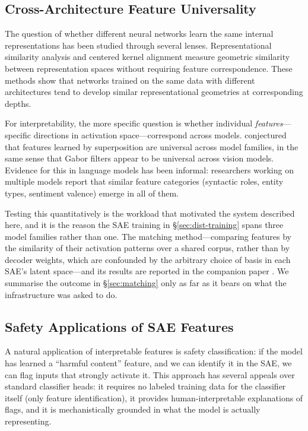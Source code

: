 \documentclass[11pt]{article}
\begin{document}
\subsection{Cross-Architecture Feature Universality}

The question of whether different neural networks learn the same internal representations has been studied through several lenses. Representational similarity analysis \citep{kriegeskorte2008rsa} and centered kernel alignment \citep{kornblith2019similarity} measure geometric similarity between representation spaces without requiring feature correspondence. These methods show that networks trained on the same data with different architectures tend to develop similar representational geometries at corresponding depths.

For interpretability, the more specific question is whether individual \emph{features}---specific directions in activation space---correspond across models. \citet{elhage2022superposition} conjectured that features learned by superposition are universal across model families, in the same sense that Gabor filters appear to be universal across vision models. Evidence for this in language models has been informal: researchers working on multiple models report that similar feature categories (syntactic roles, entity types, sentiment valence) emerge in all of them.

Testing this quantitatively is the workload that motivated the system described here, and it is the reason the SAE training in \S\ref{sec:dist-training} spans three model families rather than one. The matching method---comparing features by the similarity of their activation patterns over a shared corpus, rather than by decoder weights, which are confounded by the arbitrary choice of basis in each SAE's latent space---and its results are reported in the companion paper \citep{melton2026saecomparison}. We summarise the outcome in \S\ref{sec:matching} only as far as it bears on what the infrastructure was asked to do.

\subsection{Safety Applications of SAE Features}

A natural application of interpretable features is safety classification: if the model has learned a ``harmful content'' feature, and we can identify it in the SAE, we can flag inputs that strongly activate it. This approach has several appeals over standard classifier heads: it requires no labeled training data for the classifier itself (only feature identification), it provides human-interpretable explanations of flags, and it is mechanistically grounded in what the model is actually representing.
\end{document}
